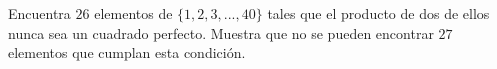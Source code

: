 Encuentra $26$ elementos de $\{1, 2, 3, ... , 40\}$ tales que el producto de dos de ellos nunca sea un cuadrado perfecto. 
Muestra que no se pueden encontrar $27$ elementos que cumplan esta condición. 